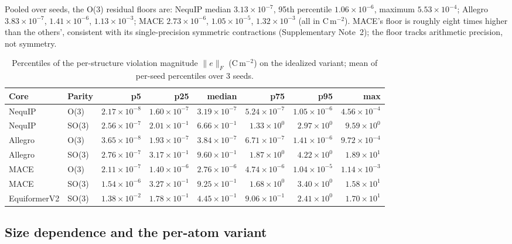 Pooled over seeds, the O(3) residual floors are: NequIP median $3.13\times10^{-7}$, 95th percentile $1.06\times10^{-6}$, maximum $5.53\times10^{-4}$; Allegro $3.83\times10^{-7}$, $1.41\times10^{-6}$, $1.13\times10^{-3}$; MACE $2.73\times10^{-6}$, $1.05\times10^{-5}$, $1.32\times10^{-3}$ (all in C\,m$^{-2}$). MACE's floor is roughly eight times higher than the others', consistent with its single-precision symmetric contractions (Supplementary Note~2); the floor tracks arithmetic precision, not symmetry.

\begin{table}[htbp]
\centering
\scriptsize
\caption{Percentiles of the per-structure violation magnitude $\lVert e \rVert_F$ (C\,m$^{-2}$) on the idealized variant; mean of per-seed percentiles over 3 seeds.}
\label{stab:distributions}
\begin{tabular}{llrrrrrr}
\toprule
Core & Parity & p5 & p25 & median & p75 & p95 & max \\
\midrule
NequIP & O(3) & $2.17\times10^{-8}$ & $1.60\times10^{-7}$ & $3.19\times10^{-7}$ & $5.24\times10^{-7}$ & $1.05\times10^{-6}$ & $4.56\times10^{-4}$ \\
NequIP & SO(3) & $2.56\times10^{-7}$ & $2.01\times10^{-1}$ & $6.66\times10^{-1}$ & $1.33\times10^{0}$ & $2.97\times10^{0}$ & $9.59\times10^{0}$ \\
Allegro & O(3) & $3.65\times10^{-8}$ & $1.93\times10^{-7}$ & $3.84\times10^{-7}$ & $6.71\times10^{-7}$ & $1.41\times10^{-6}$ & $9.72\times10^{-4}$ \\
Allegro & SO(3) & $2.76\times10^{-7}$ & $3.17\times10^{-1}$ & $9.60\times10^{-1}$ & $1.87\times10^{0}$ & $4.22\times10^{0}$ & $1.89\times10^{1}$ \\
MACE & O(3) & $2.11\times10^{-7}$ & $1.40\times10^{-6}$ & $2.76\times10^{-6}$ & $4.74\times10^{-6}$ & $1.04\times10^{-5}$ & $1.14\times10^{-3}$ \\
MACE & SO(3) & $1.54\times10^{-6}$ & $3.27\times10^{-1}$ & $9.25\times10^{-1}$ & $1.68\times10^{0}$ & $3.40\times10^{0}$ & $1.58\times10^{1}$ \\
EquiformerV2 & SO(3) & $1.38\times10^{-2}$ & $1.78\times10^{-1}$ & $4.45\times10^{-1}$ & $9.06\times10^{-1}$ & $2.41\times10^{0}$ & $1.70\times10^{1}$ \\
\bottomrule
\end{tabular}
\end{table}

\subsection*{Size dependence and the per-atom variant}

